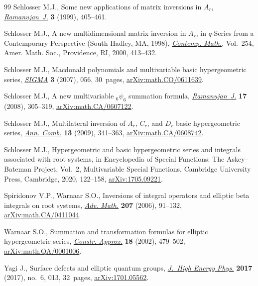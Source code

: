 \documentclass[pdftex]{sigma}%
\numberwithin{equation}{section}
\begin{document}
\begin{thebibliography}{99}
Schlosser M.J., Some new applications of matrix inversions in {$A_r$},
 \href{https://doi.org/10.1023/A:1009809424076}{\textit{Ramanujan~J.}} \textbf{3} (1999), 405--461.

Schlosser M.J., A new multidimensional matrix inversion in {$A_r$}, in
 {$q$}-Series from a Contemporary Perspective ({S}outh {H}adley, {MA}, 1998),
 \href{https://doi.org/10.1090/conm/254/03964}{\textit{Contemp. Math.}}, Vol.~254, Amer. Math. Soc., Providence, RI, 2000,
 413--432.

Schlosser M.J., Macdonald polynomials and multivariable basic hypergeometric
 series, \href{https://doi.org/10.3842/SIGMA.2007.056}{\textit{SIGMA}} \textbf{3} (2007), 056, 30~pages,
 \href{https://arxiv.org/abs/math.CO/0611639}{arXiv:math.CO/0611639}.

Schlosser M.J., A new multivariable {$_6\psi_6$} summation formula,
 \href{https://doi.org/10.1007/s11139-007-9017-9}{\textit{Ramanujan~J.}} \textbf{17} (2008), 305--319, \href{https://arxiv.org/abs/math.CA/0607122}{arXiv:math.CA/0607122}.

Schlosser M.J., Multilateral inversion of {$A_r$}, {$C_r$}, and {$D_r$} basic
 hypergeometric series, \href{https://doi.org/10.1007/s00026-009-0026-9}{\textit{Ann. Comb.}} \textbf{13} (2009), 341--363,
 \href{https://arxiv.org/abs/math.CA/0608742}{arXiv:math.CA/0608742}.

Schlosser M.J., Hypergeometric and basic hypergeometric series and integrals
 associated with root systems, in Encyclopedia of Special Functions: The Askey--Bateman Project, Vol.~2, Multivariable Special Functions, Cambridge University Press, Cambridge, 2020, 122--158, \href{https://arxiv.org/abs/1705.09221}{arXiv:1705.09221}.

Spiridonov V.P., Warnaar S.O., Inversions of integral operators and elliptic
 beta integrals on root systems, \href{https://doi.org/10.1016/j.aim.2005.11.007}{\textit{Adv. Math.}} \textbf{207} (2006),
 91--132, \href{https://arxiv.org/abs/math.CA/0411044}{arXiv:math.CA/0411044}.

Warnaar S.O., Summation and transformation formulas for elliptic hypergeometric
 series, \href{https://doi.org/10.1007/s00365-002-0501-6}{\textit{Constr. Approx.}} \textbf{18} (2002), 479--502,
 \href{https://arxiv.org/abs/math.QA/0001006}{arXiv:math.QA/0001006}.

Yagi J., Surface defects and elliptic quantum groups, \href{https://doi.org/10.1007/JHEP06(2017)013}{\textit{J.~High Energy
 Phys.}} \textbf{2017} (2017), no.~6, 013, 32~pages, \href{https://arxiv.org/abs/1701.05562}{arXiv:1701.05562}.

\end{thebibliography}\LastPageEnding
\end{document}
